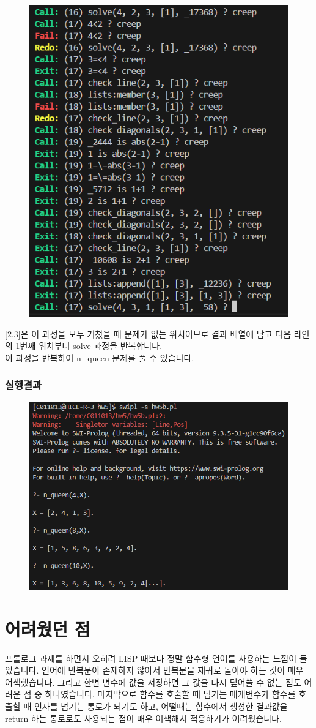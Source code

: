 \documentclass{article}
\begin{document}
\newpage
\begin{figure}[!htb]
    \centering
    \includegraphics[width=0.8\linewidth]{hw5b_6.png}
\end{figure}
[2,3]은 이 과정을 모두 거쳤을 때 문제가 없는 위치이므로 결과 배열에 담고 다음 라인의 1번째 위치부터 solve 과정을 반복합니다.\\
이 과정을 반복하여 n\_queen 문제를 풀 수 있습니다.

\newpage

\subsubsection{실행결과}
\begin{figure}[!htb]
    \centering
    \includegraphics[width=0.8\linewidth]{hw5b_1.png}
\end{figure}

\section{어려웠던 점}
\quad 프롤로그 과제를 하면서 오히려 LISP 때보다 정말 함수형 언어를 사용하는 느낌이 들었습니다. 언어에 반복문이 존재하지 않아서 반복문을 재귀로 돌아야 하는 것이 매우 어색했습니다. 그리고 한변 변수에 값을 저장하면 그 값을 다시 덮어쓸 수 없는 점도 어려운 점 중 하나였습니다. 마지막으로 함수를 호출할 때 넘기는 매개변수가 함수를 호출할 때 인자를 넘기는 통로가 되기도 하고, 어떨때는 함수에서 생성한 결과값을 return 하는 통로로도 사용되는 점이 매우 어색해서 적응하기가 어려웠습니다.
\end{document}
